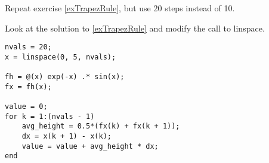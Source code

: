 \begin{ex}%
Repeat exercise \ref{exTrapezRule}, but use 20 steps instead of 10.
\begin{hint}
Look at the solution to \ref{exTrapezRule} and modify the call to linspace.
\end{hint}
\begin{sol}
\begin{lstlisting}
nvals = 20;
x = linspace(0, 5, nvals);

fh = @(x) exp(-x) .* sin(x);
fx = fh(x);

value = 0;
for k = 1:(nvals - 1)
    avg_height = 0.5*(fx(k) + fx(k + 1));
    dx = x(k + 1) - x(k);
    value = value + avg_height * dx;
end
\end{lstlisting}
\end{sol}
\end{ex}

